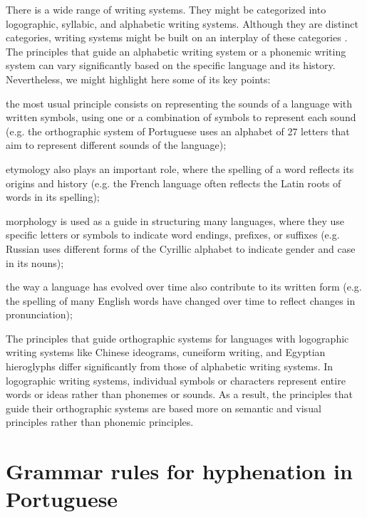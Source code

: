 \documentclass{article}
\begin{document}
There is a wide range of writing systems. They might be categorized into
logographic, syllabic, and alphabetic writing systems.  Although they are
distinct categories, writing systems might be built on an interplay of these
categories \cite{coulmas2003}. The principles that guide an alphabetic writing
system or a phonemic writing system can vary significantly based on the
specific language and its history. Nevertheless, we might highlight here some
of its key points:
\begin{enumerate*}[label=\arabic*)]
    \item the most usual principle consists on representing the sounds of a
	language with written symbols, using one or a combination of symbols to
	represent each sound (e.g. the orthographic system of Portuguese uses
	an alphabet of 27 letters that aim to represent different sounds of the
	language); 
    \item etymology also plays an important role, where the
	spelling of a word reflects its origins and history (e.g. the French
	language often reflects the Latin roots of words in its spelling);
    \item morphology is used as a guide in structuring many languages, where
	they use specific letters or symbols to indicate word endings,
	prefixes, or suffixes (e.g. Russian uses different forms of the
	Cyrillic alphabet to indicate gender and case in its nouns); 
    \item the way a language has evolved over time also contribute to its 
	written form (e.g. the spelling of many English words have changed 
	over time to reflect changes in pronunciation);
\end{enumerate*}
The principles that guide orthographic systems for languages with logographic
writing systems like Chinese ideograms, cuneiform writing, and Egyptian
hieroglyphs differ significantly from those of alphabetic writing systems. In
logographic writing systems, individual symbols or characters represent entire
words or ideas rather than phonemes or sounds. As a result, the principles that
guide their orthographic systems are based more on semantic and visual
principles rather than phonemic principles.


\section{Grammar rules for hyphenation in Portuguese}\label{sec-grammar-port}
\end{document}
